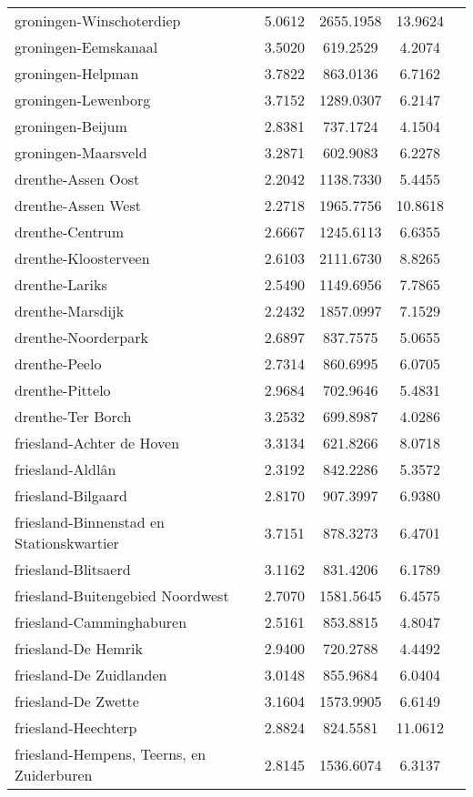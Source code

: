 \begin{longtable}{llccc}
groningen-Winschoterdiep & 5.0612 & 2655.1958 & 13.9624 \\
groningen-Eemskanaal & 3.5020 & 619.2529 & 4.2074 \\
groningen-Helpman & 3.7822 & 863.0136 & 6.7162 \\
groningen-Lewenborg & 3.7152 & 1289.0307 & 6.2147 \\
groningen-Beijum & 2.8381 & 737.1724 & 4.1504 \\
groningen-Maarsveld & 3.2871 & 602.9083 & 6.2278 \\
drenthe-Assen Oost & 2.2042 & 1138.7330 & 5.4455 \\
drenthe-Assen West & 2.2718 & 1965.7756 & 10.8618 \\
drenthe-Centrum & 2.6667 & 1245.6113 & 6.6355 \\
drenthe-Kloosterveen & 2.6103 & 2111.6730 & 8.8265 \\
drenthe-Lariks & 2.5490 & 1149.6956 & 7.7865 \\
drenthe-Marsdijk & 2.2432 & 1857.0997 & 7.1529 \\
drenthe-Noorderpark & 2.6897 & 837.7575 & 5.0655 \\
drenthe-Peelo & 2.7314 & 860.6995 & 6.0705 \\
drenthe-Pittelo & 2.9684 & 702.9646 & 5.4831 \\
drenthe-Ter Borch & 3.2532 & 699.8987 & 4.0286 \\
friesland-Achter de Hoven & 3.3134 & 621.8266 & 8.0718 \\
friesland-Aldlân & 2.3192 & 842.2286 & 5.3572 \\
friesland-Bilgaard & 2.8170 & 907.3997 & 6.9380 \\
friesland-Binnenstad en Stationskwartier & 3.7151 & 878.3273 & 6.4701 \\
friesland-Blitsaerd & 3.1162 & 831.4206 & 6.1789 \\
friesland-Buitengebied Noordwest & 2.7070 & 1581.5645 & 6.4575 \\
friesland-Camminghaburen & 2.5161 & 853.8815 & 4.8047 \\
friesland-De Hemrik & 2.9400 & 720.2788 & 4.4492 \\
friesland-De Zuidlanden & 3.0148 & 855.9684 & 6.0404 \\
friesland-De Zwette & 3.1604 & 1573.9905 & 6.6149 \\
friesland-Heechterp & 2.8824 & 824.5581 & 11.0612 \\
friesland-Hempens, Teerns, en Zuiderburen & 2.8145 & 1536.6074 & 6.3137 \\

\end{longtable}
